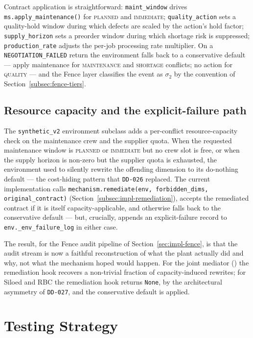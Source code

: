Contract application is straightforward: \texttt{maint\_window} drives
\texttt{ms.apply\_maintenance()} for \textsc{planned} and
\textsc{immediate}; \texttt{quality\_action} sets a quality-hold window
during which defects are scaled by the action's hold factor;
\texttt{supply\_horizon} sets a preorder window during which shortage
risk is suppressed; \texttt{production\_rate} adjusts the per-job
processing rate multiplier. On a \texttt{NEGOTIATION\_FAILED} return
the environment falls back to a conservative default --- apply
maintenance for \textsc{maintenance} and \textsc{shortage} conflicts;
no action for \textsc{quality} --- and the Fence layer classifies the
event as $\sigma_2$ by the convention of
Section~\ref{subsec:fence-tiers}.

\subsection{Resource capacity and the explicit-failure path}

The \texttt{synthetic\_v2} environment subclass adds a per-conflict
resource-capacity check on the maintenance crew and the supplier
quota. When the requested maintenance window is \textsc{planned} or
\textsc{immediate} but no crew slot is free, or when the supply horizon
is non-zero but the supplier quota is exhausted, the environment used
to silently rewrite the offending dimension to its do-nothing default
--- the cost-hiding pattern that \texttt{DD-026} replaced. The current
implementation calls \texttt{mechanism.remediate(env, forbidden\_dims,
original\_contract)} (Section~\ref{subsec:impl-remediation}), accepts
the remediated contract if it is itself capacity-applicable, and
otherwise falls back to the conservative default --- but, crucially,
appends an explicit-failure record to \texttt{env.\_env\_failure\_log}
in either case.

The result, for the Fence audit pipeline of Section~\ref{sec:impl-fence},
is that the audit stream is now a faithful reconstruction of what the
plant actually did and why, not what the mechanism hoped would happen.
For the joint mediator (\NEXUS{}) the remediation hook recovers a
non-trivial fraction of capacity-induced rewrites; for Siloed and RBC
the remediation hook returns \texttt{None}, by the architectural
asymmetry of \texttt{DD-027}, and the conservative default is applied.

\section{Testing Strategy}
\label{sec:impl-testing}

